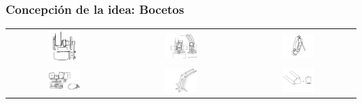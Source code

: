 \documentclass{beamer}
\begin{document}
\begin{frame}
  \frametitle{Concepción de la idea: Bocetos}
  \begin{table}[htbp]
    \centering
    \begin{tabular}{ccc}
        \includegraphics[width=0.3\textwidth, valign=m]{figs/boceto4.png} & \includegraphics[width=0.3\textwidth, valign=m]{figs/boceto2.png} 
         & \includegraphics[width=0.3\textwidth, valign=m]{figs/boceto7.jpeg} \\
         \includegraphics[width=0.3\textwidth, valign=m]{figs/boceto5.png} & \includegraphics[width=0.3\textwidth, valign=m]{figs/boceto1.png} 
         & \includegraphics[width=0.3\textwidth, valign=m]{figs/boceto8.jpeg}
        
    \end{tabular}
  \end{table}
\end{frame}
\end{document}
